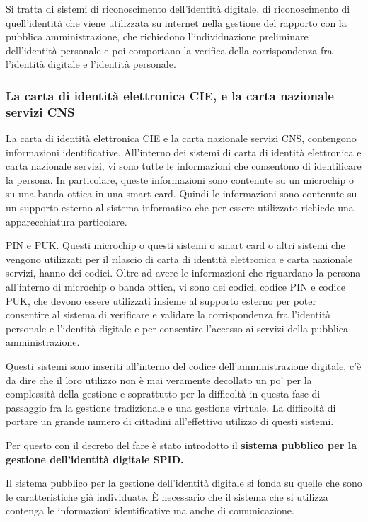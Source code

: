 Si tratta di sistemi di riconoscimento dell'identità digitale, di riconoscimento di quell'identità che viene utilizzata su internet nella gestione del rapporto con la pubblica amministrazione, che richiedono l'individuazione preliminare dell'identità personale e poi comportano la verifica della corrispondenza fra l'identità digitale e l'identità personale. 

\subsubsection{La carta di identità elettronica CIE, e la carta nazionale servizi CNS}

La carta di identità elettronica CIE e la carta nazionale servizi CNS, contengono informazioni identificative. All'interno dei sistemi di carta di identità elettronica e carta nazionale servizi, vi sono tutte le informazioni che consentono di identificare la persona. In particolare, queste informazioni sono contenute su un microchip o su una banda ottica in una smart card. Quindi le informazioni sono contenute su un supporto esterno al sistema informatico che per essere utilizzato richiede una apparecchiatura particolare. 

PIN e PUK. Questi microchip o questi sistemi o smart card o altri sistemi che vengono utilizzati per il rilascio di carta di identità elettronica e carta nazionale servizi, hanno dei codici. Oltre ad avere le informazioni che riguardano la persona all'interno di microchip o banda ottica, vi sono dei codici, codice PIN e codice PUK, che devono essere utilizzati insieme al supporto esterno per poter consentire al sistema di verificare e validare la corrispondenza fra l'identità personale e l'identità digitale e per consentire l'accesso ai servizi della pubblica amministrazione.

Questi sistemi sono inseriti all'interno del codice dell'amministrazione digitale, c'è da dire che il loro utilizzo non è mai veramente decollato un po' per la complessità della gestione e soprattutto per la difficoltà in questa fase di passaggio fra la gestione tradizionale e una gestione virtuale. La difficoltà di portare un grande numero di cittadini all'effettivo utilizzo di questi sistemi. 

Per questo con il decreto del fare è stato introdotto il \textbf{sistema pubblico per la gestione dell'identità digitale SPID.}\par 

Il sistema pubblico per la gestione dell'identità digitale si fonda su quelle che sono le caratteristiche già individuate. È necessario che il sistema che si utilizza contenga le informazioni identificative ma anche di comunicazione.

